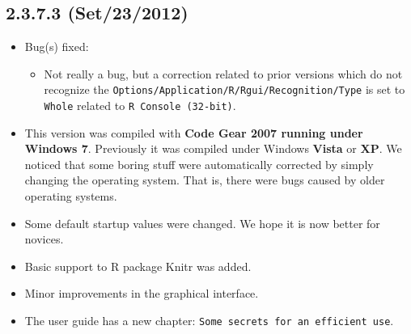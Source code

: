 \subsection*{2.3.7.3 (Set/23/2012)}
\begin{itemize}
  \item Bug(s) fixed:
    \begin{itemize}
      \item Not really a bug, but a correction related to prior versions which do not recognize
        the \texttt{Options/Application/R/Rgui/Recognition/Type} is set to \texttt{Whole} related to \texttt{R Console (32-bit)}.
    \end{itemize}
  \item This version was compiled with \textbf{Code Gear 2007 running under Windows 7}.
    Previously it was compiled under Windows \textbf{Vista} or \textbf{XP}.
    We noticed that some boring stuff were automatically corrected by simply changing the operating system.
    That is, there were bugs caused by older operating systems.
  \item Some default startup values were changed. We hope it is now better for novices.
  \item Basic support to R package Knitr was added.
  \item Minor improvements in the graphical interface.
  \item The user guide has a new chapter: \texttt{Some secrets for an efficient use}.
\end{itemize}
